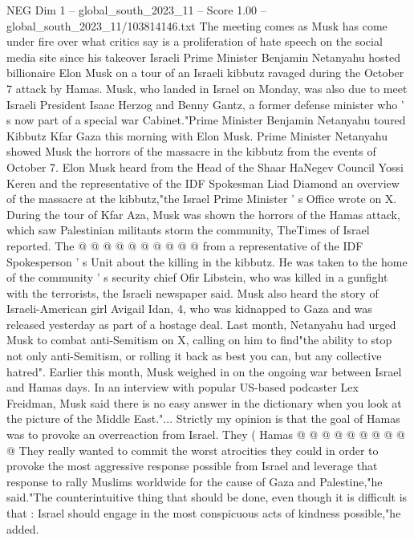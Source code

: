 \begin{textsample}{NEG Dim 1 – global\_south\_2023\_11 – Score 1.00 – global\_south\_2023\_11/103814146.txt}  \label{ex:f1_neg_321}
The meeting comes as Musk has come under fire over what critics say is a proliferation of hate speech on the social media site since his takeover Israeli Prime Minister Benjamin Netanyahu hosted billionaire Elon Musk on a tour of an Israeli kibbutz ravaged during the October 7 attack by Hamas.
Musk, who landed in Israel on Monday, was also due to meet Israeli President Isaac Herzog and Benny Gantz, a former defense minister who ' s now part of a special war Cabinet."Prime Minister Benjamin Netanyahu toured Kibbutz Kfar Gaza this morning with Elon Musk.
Prime Minister Netanyahu showed Musk the horrors of the massacre in the kibbutz from the events of October 7.
Elon Musk heard from the Head of the Shaar HaNegev Council Yossi Keren and the representative of the IDF Spokesman Liad Diamond an overview of the massacre at the kibbutz,"the Israel Prime Minister ' s Office wrote on X.
During the tour of Kfar Aza, Musk was shown the horrors of the Hamas attack, which saw Palestinian militants storm the community, TheTimes of Israel reported.
The @ @ @ @ @ @ @ @ @ @ from a representative of the IDF Spokesperson ' s Unit about the killing in the kibbutz.
He was taken to the home of the community ' s security chief Ofir Libstein, who was killed in a gunfight with the terrorists, the Israeli newspaper said.
Musk also heard the story of Israeli-American girl Avigail Idan, 4, who was kidnapped to Gaza and was released yesterday as part of a hostage deal.
Last month, Netanyahu had urged Musk to combat anti-Semitism on X, calling on him to find"the ability to stop not only anti-Semitism, or rolling it back as best you can, but any collective hatred".
Earlier this month, Musk weighed in on the ongoing war between Israel and Hamas days.
In an interview with popular US-based podcaster Lex Freidman, Musk said there is no easy answer in the dictionary when you look at the picture of the Middle East."...
Strictly my opinion is that the goal of Hamas was to provoke an overreaction from Israel.
They ( Hamas @ @ @ @ @ @ @ @ @ @ They really wanted to commit the worst atrocities they could in order to provoke the most aggressive response possible from Israel and leverage that response to rally Muslims worldwide for the cause of Gaza and Palestine,"he said."The counterintuitive thing that should be done, even though it is difficult is that : Israel should engage in the most conspicuous acts of kindness possible,"he added.

\end{textsample}
